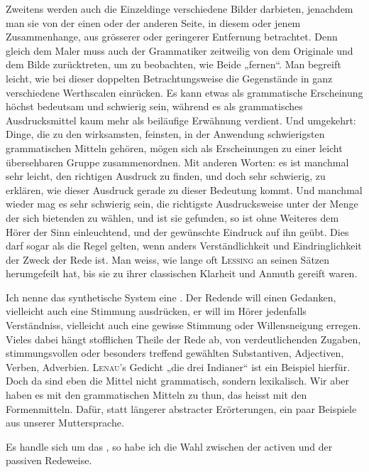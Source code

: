 Zweitens werden auch die Einzeldinge verschiedene Bilder darbieten, \label{fp.97} jenachdem man sie von der einen oder der anderen Seite, in diesem oder jenem Zusammenhange, aus grösserer oder geringerer Entfernung betrachtet. Denn gleich dem Maler muss auch der Grammatiker zeitweilig von dem Originale und dem Bilde zurücktreten, um zu beobachten, wie Beide „fernen“. Man begreift leicht, wie bei dieser doppelten Betrachtungsweise die Gegenstände in ganz verschiedene Werthscalen einrücken. Es kann etwas als grammatische Erscheinung höchst bedeutsam und schwierig sein, während es als grammatisches Ausdrucksmittel kaum mehr als beiläufige Erwähnung verdient. Und umgekehrt: Dinge, die zu den wirksamsten, feinsten, in der Anwendung schwierigsten grammatischen Mitteln gehören, mögen sich als Erscheinungen zu einer leicht übersehbaren Gruppe zusammenordnen. Mit anderen Worten: es ist manchmal sehr leicht, den richtigen Ausdruck zu finden, und doch sehr schwierig, zu erklären, wie dieser Ausdruck gerade zu dieser Bedeutung kommt. Und manchmal wieder mag es sehr schwierig sein, die richtigste Ausdrucksweise unter der Menge der sich bietenden zu wählen, und ist sie gefunden, so ist ohne Weiteres dem Hörer der Sinn einleuchtend, und der gewünschte Eindruck auf ihn geübt. Dies darf sogar als die Regel gelten, wenn anders Verständlichkeit und Eindringlichkeit der Zweck der Rede ist. Man weiss, wie lange oft \textsc{Lessing} an seinen Sätzen herumgefeilt hat, bis sie zu ihrer classischen Klarheit und Anmuth gereift waren.

Ich nenne das synthetische System eine . Der Redende will einen Gedanken, vielleicht auch eine Stimmung ausdrücken, er will im Hörer jedenfalls Verständniss, vielleicht auch eine gewisse Stimmung oder Willensneigung erregen. Vieles dabei hängt  stofflichen Theile der Rede ab, von verdeutlichenden Zugaben, stimmungsvollen oder besonders treffend gewählten Substantiven, Adjectiven, Verben, Adverbien. \textsc{Lenau}’s Gedicht „die drei Indianer“ ist ein Beispiel hierfür. Doch da sind eben die Mittel nicht grammatisch, sondern lexikalisch. Wir aber haben es mit den grammatischen Mitteln zu thun, das heisst mit den Formenmitteln. Dafür, statt längerer abstracter Erörterungen, ein paar Beispiele aus unserer Muttersprache.

\label{sp.95}

Es handle sich um das , so habe ich die Wahl zwischen der activen und der passiven Redeweise.

